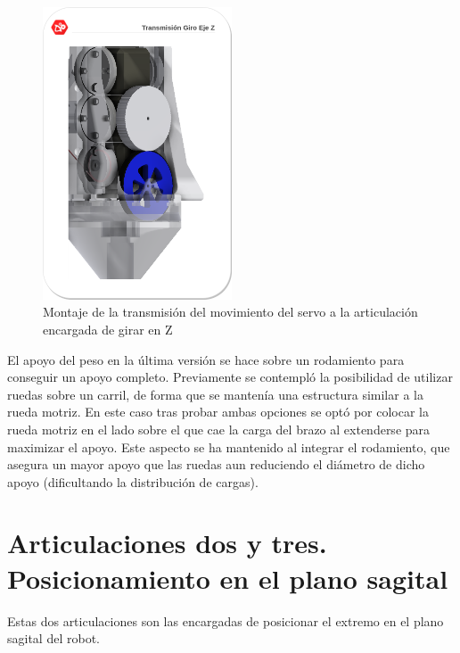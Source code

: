 	\begin{figure}[H]
		\centering
		\includegraphics[width=0.5\textwidth]{figuras/Imagenes_Mecanica/RuedasGiroZ.png}
		\caption{Montaje de la transmisión del movimiento del servo a la articulación encargada de girar en Z}
		\label{fig:Mecanica:giro_z}
	\end{figure}

	El apoyo del peso en la última versión se hace sobre un rodamiento  para conseguir un apoyo completo. Previamente se contempló la posibilidad de utilizar ruedas sobre un carril, de forma que se mantenía una estructura similar a la rueda motriz. En este caso tras probar ambas opciones se optó por colocar la rueda motriz en el lado sobre el que cae la carga del brazo al extenderse para maximizar el apoyo. Este aspecto se ha mantenido al integrar el rodamiento, que asegura un mayor apoyo que las ruedas aun reduciendo el diámetro de dicho apoyo (dificultando la distribución de cargas).



\section{Articulaciones dos y tres. Posicionamiento en el plano sagital} \label{sec:Mecanica:articulacion_dostres}
    Estas dos articulaciones son las encargadas de posicionar el extremo en el plano sagital del robot.
    \\

